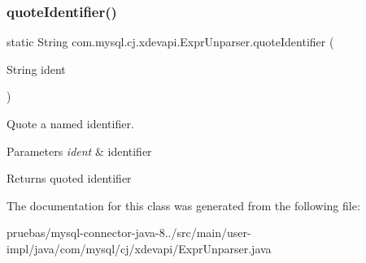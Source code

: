 \subsubsection{\texorpdfstring{quote\+Identifier()}{quoteIdentifier()}}
{\footnotesize\ttfamily static String com.\+mysql.\+cj.\+xdevapi.\+Expr\+Unparser.\+quote\+Identifier (\begin{DoxyParamCaption}\item[{String}]{ident }\end{DoxyParamCaption})\hspace{0.3cm}{\ttfamily [static]}}

Quote a named identifier.


\begin{DoxyParams}{Parameters}
{\em ident} & identifier \\
\hline
\end{DoxyParams}
\begin{DoxyReturn}{Returns}
quoted identifier 
\end{DoxyReturn}


The documentation for this class was generated from the following file\+:\begin{DoxyCompactItemize}
\item 
pruebas/mysql-\/connector-\/java-\/8../src/main/user-\/impl/java/com/mysql/cj/xdevapi/Expr\+Unparser.\+java\end{DoxyCompactItemize}
